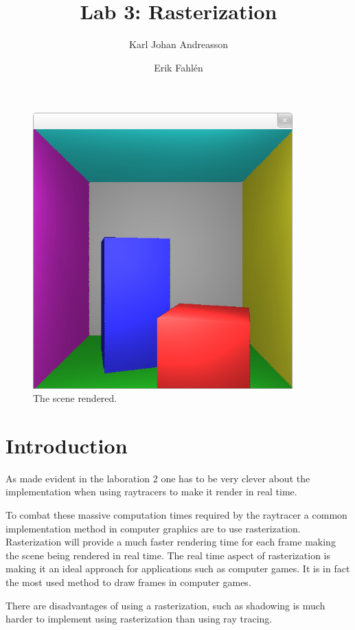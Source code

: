 \documentclass{article}
\begin{document}
\title{Lab 3: Rasterization}

\author{Karl Johan Andreasson \and Erik Fahlén}

\maketitle

\begin{figure}
    \centering
    \includegraphics[width=10cm]{title.png}
    \caption{The scene rendered.}
    \label{fig:main}
\end{figure}

\section{Introduction}
As made evident in the laboration 2 one has to be very clever about the
implementation when using raytracers to make it render in real time.

To combat these massive computation times required by the raytracer a common
implementation method in computer graphics are to use rasterization.
Rasterization will provide a much faster rendering time for each frame making
the scene being rendered in real time. The real time aspect of rasterization is
making it an ideal approach for applications such as computer games. It is in
fact the most used method to draw frames in computer games.

There are disadvantages of using a rasterization, such as shadowing is much
harder to implement using rasterization than using ray tracing.
\end{document}
